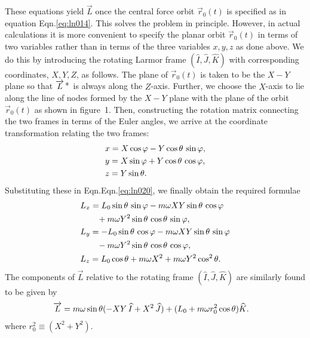 These equations yield $\vec{L}$ once the central force 
orbit 
$\vec{r}_{0}(t)$ is specified as in equation 
Eqn.\eqref{eq:ln014}. This solves the problem in principle. 
However, in actual calculations it is  more convenient to 
specify the planar orbit $\vec{r}_{0}(t)$ in terms of two 
variables rather than in terms of the three variables $x, 
y, 
z$ as done above. We do this by introducing the rotating 
Larmor frame $(\hat{I}, \hat{J}, \hat{K})$ with 
corresponding coordinates, $X, Y, Z$, as follows. The plane 
of $\vec{r}_{0}(t)$ is taken to be the $X-Y$ plane so that 
${\overrightarrow{L}^{\,{\textstyle \ast}}}$ is always along the $Z$-axis. Further, we choose 
the $X$-axis to lie along the line of nodes formed by the 
$X-Y$ plane with the plane of the orbit $\vec{r}_{0}(t)$ as 
shown in figure~1. Then, constructing the rotation matrix 
connecting the two frames in terms of the Euler angles, we 
arrive at the coordinate transformation relating the two 
frames: 
\begin{align}
 &x = X\cos\varphi - Y\cos{\theta}\,\sin\varphi, \notag\\
 & y = X\sin\varphi + Y\cos{\theta}\,\cos\varphi,\notag\\
 & z = Y\sin{\theta}.
\label{eq:ln021}
\end{align}
Substituting these in Eqn.Eqn.\eqref{eq:ln020}, we finally 
obtain the required formulae
\begin{align}
 &L_{x} = L_{0}\sin{\theta}\,\sin\varphi - m{\omega}
XY\sin{\theta}\,\cos\varphi \notag \\
&\qquad +m{\omega} Y^2\sin{\theta}\,\cos{\theta}\,\sin\varphi,
\notag \\
 & L_{y} = -L_{0}\sin{\theta}\,\cos\varphi - m{\omega}
XY\sin{\theta}\,\sin\varphi \notag \\
&\qquad - m{\omega} Y^2\sin{\theta}\,\cos{\theta}\,\cos\varphi,
\notag \\
 & L_{z} = L_{0}\cos{\theta} + m{\omega} X^2 + m{\omega}
Y^2\cos^2{\theta}.
\label{eq:ln022}
\end{align}
The components of $\vec{L}$ relative to the rotating frame  
$(\hat{I}, \hat{J}, \hat{K})$ are similarly found to be 
given by
 \begin{align}
 \overrightarrow{L}& = m{\omega}\sin{\theta}(-XY\,{\widehat{I}} +
    X^2\,{\widehat{J}})+ (L_{0} + m{\omega} r_{0}^2\cos{\theta}) {\widehat{K}}.
\label{eq:ln023}
\end{align}
where $r_{0}^2 \equiv (X^2 + Y^2)$.

